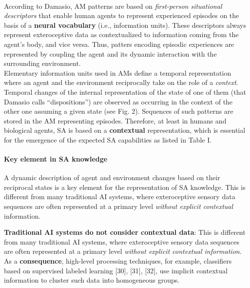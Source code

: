 \documentclass{article}
\begin{document}
			\paragraph{} According to Damasio, AM patterns are based on \emph{first-person situational descriptors} that enable human agents to represent experienced episodes on the basis of a \textbf{neural vocabulary} (i.e., information units). These descriptors always represent exteroceptive data as contextualized to information coming from the agent's body, and vice versa. Thus, patters encoding episodic experiences are represented by coupling the agent and its dynamic interaction with the surrounding environment.
			\\
			Elementary information units used in AMs define a temporal representation where an agent and the environment reciprocally take on the role of a \emph{context}. Temporal changes of the internal representation of the state of one of them (that Damasio calls “dispositions”) are observed as occurring in the context of the other one assuming a given state (see Fig. 2). Sequences of such patterns are stored in the AM representing
			episodes. Therefore, at least in humans and biological agents, SA is based on a \textbf{contextual} representation, which is essential
			for the emergence of the expected SA capabilities as listed in
			\citet{regazzoni-2020-multi-sensorial-generative-and-descriptive-self-awareness-models-for-autonomous-systems} Table I.
			
			\paragraph{Key element in SA knowledge}A dynamic description of agent and environment changes based on their reciprocal states is a key element for the representation of SA knowledge. This is different from many traditional AI systems, where exteroceptive sensory data sequences are often represented at a primary level \emph{without explicit contextual} information. 
		
			\textbf{Traditional AI systems do not consider contextual data}: This is different from many traditional AI systems, where exteroceptive sensory data sequences are often represented at a primary level \emph{without explicit contextual information}. As a \textbf{consequence}, high-level
			processing techniques, for example, classifiers based on supervised labeled learning \citet{regazzoni-2020-multi-sensorial-generative-and-descriptive-self-awareness-models-for-autonomous-systems}[30], \citet{regazzoni-2020-multi-sensorial-generative-and-descriptive-self-awareness-models-for-autonomous-systems}[31], \citet{regazzoni-2020-multi-sensorial-generative-and-descriptive-self-awareness-models-for-autonomous-systems}[32], use implicit contextual information to cluster such data into homogeneous groups.
			
\end{document}
